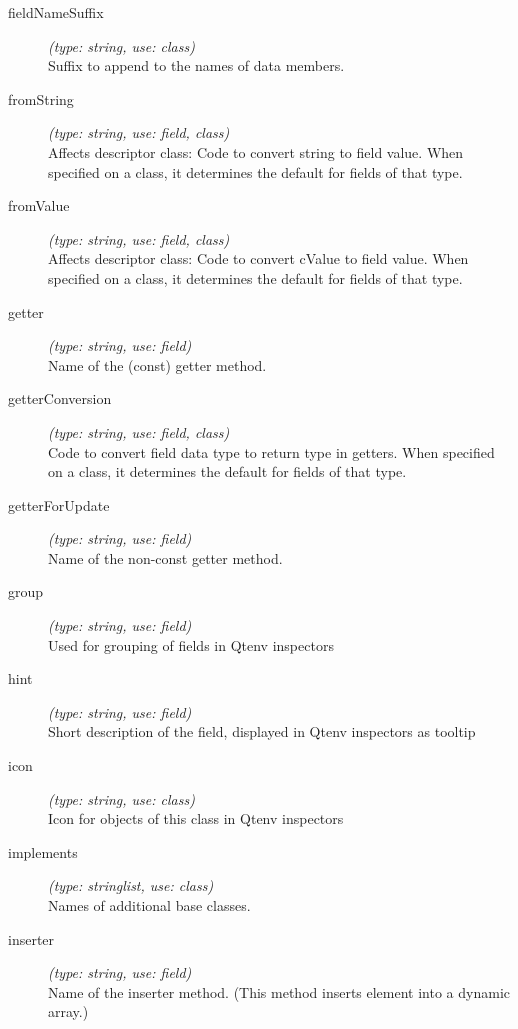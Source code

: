 \begin{description}
\item[fieldNameSuffix] \textit{(type: string, use: class)} \\
    Suffix to append to the names of data members.

\item[fromString] \textit{(type: string, use: field, class)} \\
    Affects descriptor class: Code to convert string to field value. When
    specified on a class, it determines the default for fields of that type.

\item[fromValue] \textit{(type: string, use: field, class)} \\
    Affects descriptor class: Code to convert cValue to field value. When
    specified on a class, it determines the default for fields of that type.

\item[getter] \textit{(type: string, use: field)} \\
    Name of the (const) getter method.

\item[getterConversion] \textit{(type: string, use: field, class)} \\
    Code to convert field data type to return type in getters. When specified on
    a class, it determines the default for fields of that type.

\item[getterForUpdate] \textit{(type: string, use: field)} \\
    Name of the non-const getter method.

\item[group] \textit{(type: string, use: field)} \\
    Used for grouping of fields in Qtenv inspectors

\item[hint] \textit{(type: string, use: field)} \\
    Short description of the field, displayed in Qtenv inspectors as tooltip

\item[icon] \textit{(type: string, use: class)} \\
    Icon for objects of this class in Qtenv inspectors

\item[implements] \textit{(type: stringlist, use: class)} \\
    Names of additional base classes.

\item[inserter] \textit{(type: string, use: field)} \\
    Name of the inserter method. (This method inserts element into a dynamic
    array.)


\end{description}
